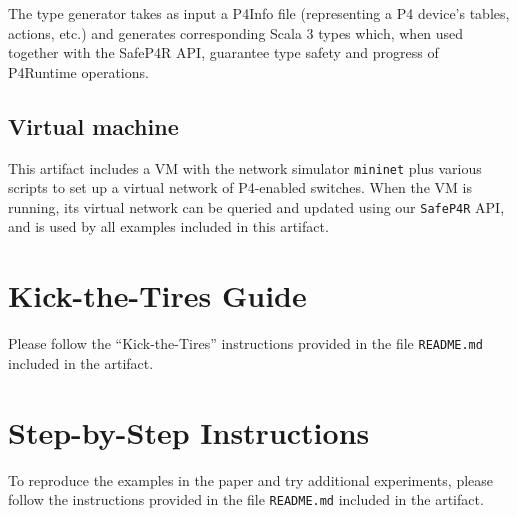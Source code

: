 \documentclass{article}
\begin{document}
The type generator takes as input a P4Info file (representing a P4 device's
tables, actions, etc.) and generates corresponding Scala 3 types which, when
used together with the SafeP4R API, guarantee type safety and progress of
P4Runtime operations.

\subsection{Virtual machine}

This artifact includes a VM with the network simulator \texttt{mininet} plus
various scripts to set up a virtual network of P4-enabled switches.  When the VM
is running, its virtual network can be queried and updated using our
\texttt{SafeP4R} API, and is used by all examples included in this artifact.


\section{Kick-the-Tires Guide}



Please follow the ``Kick-the-Tires'' instructions provided in the file
\texttt{README.md} included in the artifact.

\section{Step-by-Step Instructions}


To reproduce the examples in the paper and try additional experiments, please
follow the instructions provided in the file \texttt{README.md} included in the
artifact.



\end{document}
